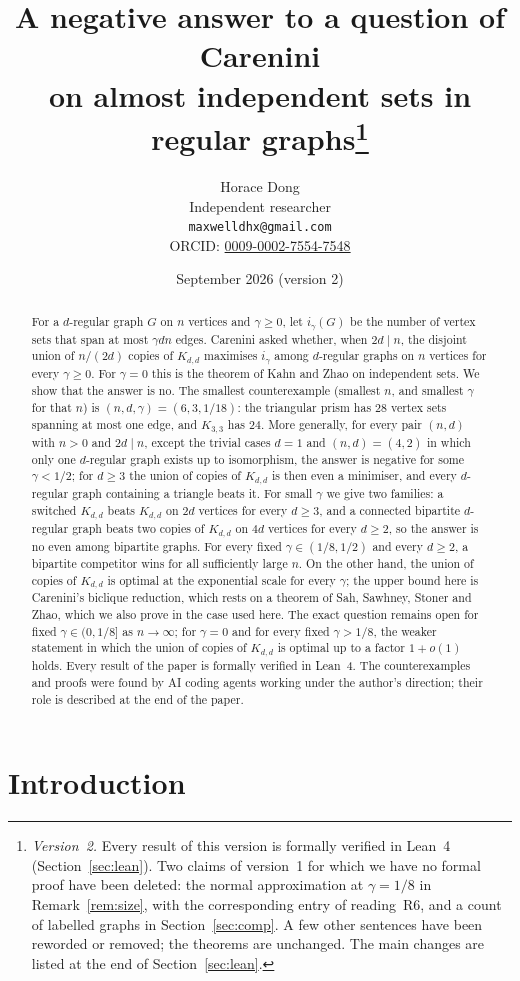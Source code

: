 \documentclass[11pt]{article}
\title{A negative answer to a question of Carenini\\ on almost independent sets in regular
graphs\thanks{\emph{Version~2.} Every result of this version is formally verified in Lean~4
(Section~\ref{sec:lean}).
Two claims of version~1 for which we have no formal proof have been deleted: the normal
approximation at $\gamma=1/8$ in Remark~\ref{rem:size}, with the corresponding entry of
reading~R6, and a count of labelled graphs in Section~\ref{sec:comp}. A few other sentences
have been reworded or removed; the theorems are unchanged. The main changes are listed at the
end of Section~\ref{sec:lean}.}}
\author{Horace Dong\\ \small Independent researcher\\
\small\texttt{maxwelldhx@gmail.com}\\
\small ORCID: \href{https://orcid.org/0009-0002-7554-7548}{0009-0002-7554-7548}}
\date{September 2026 (version 2)}
\theoremstyle{remark}
\begin{document}
\maketitle
\begin{abstract}
For a $d$-regular graph $G$ on $n$ vertices and $\gamma\ge0$, let $i_\gamma(G)$
be the number of vertex sets that span at most $\gamma dn$ edges. Carenini
asked whether, when $2d\mid n$, the disjoint union of $n/(2d)$ copies of
$K_{d,d}$ maximises $i_\gamma$ among $d$-regular graphs on $n$ vertices for
every $\gamma\ge0$. For $\gamma=0$ this is the theorem of Kahn and Zhao on
independent sets. We show that the answer is no. The smallest counterexample
(smallest $n$, and smallest $\gamma$ for that $n$) is
$(n,d,\gamma)=(6,3,1/18)$: the triangular prism has $28$ vertex sets
spanning at most one edge, and $K_{3,3}$ has $24$. More generally, for every
pair $(n,d)$ with $n>0$ and $2d\mid n$, except the trivial cases $d=1$ and
$(n,d)=(4,2)$ in which only one $d$-regular graph exists up to isomorphism,
the answer is
negative for some $\gamma<1/2$; for $d\ge3$ the union of copies of $K_{d,d}$
is then even a minimiser, and every $d$-regular graph containing a triangle
beats it. For small $\gamma$ we give two families: a switched $K_{d,d}$ beats
$K_{d,d}$ on $2d$ vertices for every $d\ge3$, and a connected bipartite
$d$-regular graph beats two copies of $K_{d,d}$ on $4d$ vertices for every
$d\ge2$, so the answer is no even among bipartite graphs. For every fixed
$\gamma\in(1/8,1/2)$ and every $d\ge2$, a bipartite competitor wins for all
sufficiently large $n$. On the other hand, the union of copies of $K_{d,d}$ is
optimal at the exponential scale for every $\gamma$; the upper bound here is
Carenini's biclique reduction, which rests on a theorem of Sah, Sawhney,
Stoner and Zhao, which we also prove in the case used here. The exact
question remains open for
fixed $\gamma\in(0,1/8]$ as $n\to\infty$; for $\gamma=0$ and for every fixed
$\gamma>1/8$, the weaker statement in which the union of copies of $K_{d,d}$
is optimal up to a factor $1+o(1)$ holds. Every result of the paper is
formally verified in Lean~4.
The counterexamples and proofs were found by AI coding agents working under
the author's direction; their role is described at the end of the paper.
\end{abstract}

\section{Introduction}
\end{document}
